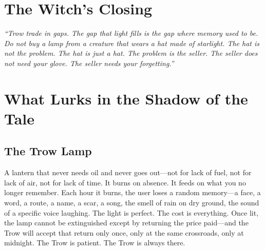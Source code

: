 \section*{The Witch's Closing}
\textit{``Trow trade in gaps. The gap that light fills is the gap where memory used to be. Do not buy a lamp from a creature that wears a hat made of starlight. The hat is not the problem. The hat is just a hat. The problem is the seller. The seller does not need your glove. The seller needs your forgetting.''}

\section*{What Lurks in the Shadow of the Tale}

\subsection*{The Trow Lamp}

A lantern that never needs oil and never goes out---not for lack of fuel, not for lack of air, not for lack of time. It burns on absence. It feeds on what you no longer remember. Each hour it burns, the user loses a random memory---a face, a word, a route, a name, a scar, a song, the smell of rain on dry ground, the sound of a specific voice laughing. The light is perfect. The cost is everything. Once lit, the lamp cannot be extinguished except by returning the price paid---and the Trow will accept that return only once, only at the same crossroads, only at midnight. The Trow is patient. The Trow is always there.

